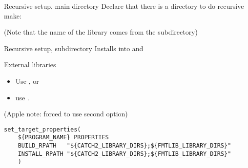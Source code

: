 \begin{numberedframe}{Recursive setup, main directory}
  Declare that there is a directory to do recursive make:
  \lstset{numbers=left,numberstyle=\tiny}
  
  (Note that the name of the library comes from the subdirectory)
\end{numberedframe}

\begin{numberedframe}{Recursive setup, subdirectory}
  Installs into  and 
  \lstset{numbers=left,numberstyle=\tiny}
  
\end{numberedframe}

\begin{numberedframe}{External libraries}
  \begin{itemize}
  \item Use , or
  \item use .
  \end{itemize}
  (Apple note: forced to use second option)
\begin{lstlisting}[basicstyle=\scriptsize\ttfamily]
set_target_properties(
    ${PROGRAM_NAME} PROPERTIES
    BUILD_RPATH   "${CATCH2_LIBRARY_DIRS};${FMTLIB_LIBRARY_DIRS}"
    INSTALL_RPATH "${CATCH2_LIBRARY_DIRS};${FMTLIB_LIBRARY_DIRS}"
    )
\end{lstlisting}
\end{numberedframe}

\endinput

\begin{numberedframe}{}
  \begin{itemize}
  \item 
  \end{itemize}
\begin{lstlisting}
\end{lstlisting}
\end{numberedframe}

